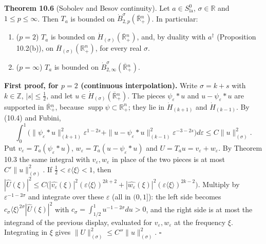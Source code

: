 \documentclass[
  11pt,
]{article}
\providecommand{\tightlist}{%
  \setlength{\itemsep}{0pt}\setlength{\parskip}{0pt}}
\begin{document}
\textbf{Theorem 10.6} (Sobolev and Besov continuity). Let
\(a\in S^0_{\mathrm{la}}\), \(\sigma\in\mathbb R\) and
\(1\leq p\leq\infty\). Then \(T_a\) is bounded on
\(\dot B^\sigma_{2,p}(\overline{\mathbb R}{}^n_+)\). In particular:

\begin{enumerate}
\def\labelenumi{\arabic{enumi}.}
\tightlist
\item
  (\(p=2\)) \(T_a\) is bounded on
  \(\dot H_{(\sigma)}(\overline{\mathbb R}{}^n_+)\), and, by duality
  with \(a^\dagger\) (Proposition 10.2(b)), on
  \(\overline H_{(\sigma)}(\mathbb R^n_+)\), for every real \(\sigma\).
\item
  (\(p=\infty\)) \(T_a\) is bounded on
  \(\dot B^\sigma_{2,\infty}(\overline{\mathbb R}{}^n_+)\).
\end{enumerate}

\textbf{First proof, for \(p=2\) (continuous interpolation).} Write
\(\sigma=k+s\) with \(k\in\mathbb Z\), \(|s|\leq\tfrac12\), and let
\(u\in\dot H_{(\sigma)}(\overline{\mathbb R}{}^n_+)\). The pieces
\(\psi_\varepsilon*u\) and \(u-\psi_\varepsilon*u\) are supported in
\(\overline{\mathbb R}{}^n_+\), because
\(\operatorname{supp}\psi\subset\mathbb R^n_+\); they lie in
\(\dot H_{(k+1)}\) and \(\dot H_{(k-1)}\). By (10.4) and Fubini, \[
\int_0^1\Big(\|\psi_\varepsilon*u\|^2_{(k+1)}\varepsilon^{1-2s}+\|u-\psi_\varepsilon*u\|^2_{(k-1)}\varepsilon^{-3-2s}\Big)d\varepsilon\leq C\|u\|^2_{(\sigma)} .
\] Put \(v_\varepsilon=T_a(\psi_\varepsilon*u)\),
\(w_\varepsilon=T_a(u-\psi_\varepsilon*u)\) and
\(U=T_au=v_\varepsilon+w_\varepsilon\). By Theorem 10.3 the same
integral with \(v_\varepsilon,w_\varepsilon\) in place of the two pieces
is at most \(C'\|u\|^2_{(\sigma)}\). If
\(\tfrac12<\varepsilon\langle\xi\rangle<1\), then
\(|\widehat U(\xi)|^2\leq C\big(|\widehat{v_\varepsilon}(\xi)|^2(\varepsilon\langle\xi\rangle)^{2k+2}+|\widehat{w_\varepsilon}(\xi)|^2(\varepsilon\langle\xi\rangle)^{2k-2}\big)\).
Multiply by \(\varepsilon^{-1-2\sigma}\) and integrate over these
\(\varepsilon\) (all in \((0,1]\)): the left side becomes
\(c_\sigma\langle\xi\rangle^{2\sigma}|\widehat U(\xi)|^2\) with
\(c_\sigma=\int_{1/2}^1u^{-1-2\sigma}du>0\), and the right side is at
most the integrand of the previous display, evaluated for
\(v_\varepsilon,w_\varepsilon\) at the frequency \(\xi\). Integrating in
\(\xi\) gives \(\|U\|^2_{(\sigma)}\leq C''\|u\|^2_{(\sigma)}\).
\(\square\)
\end{document}
